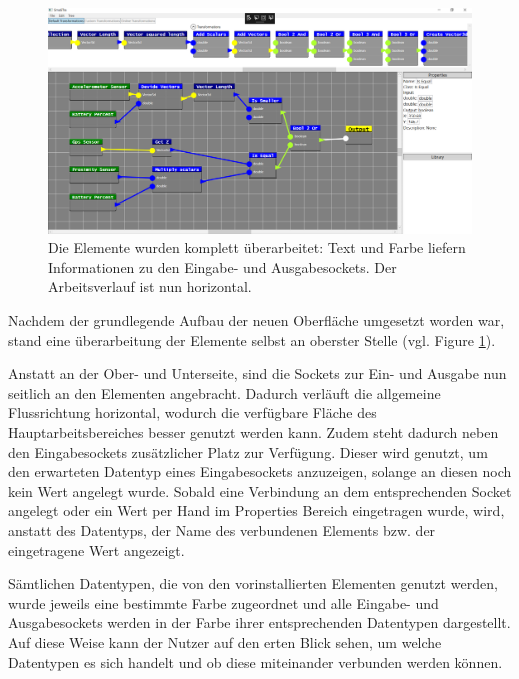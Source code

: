 \begin{figure} [h!]
	\centering
		\includegraphics[width = \textwidth]{Screenshots/Smastra_0_5_new_generic_elements}
	\caption{Die Elemente wurden komplett \"uberarbeitet: Text und Farbe liefern Informationen zu den Eingabe- und Ausgabesockets. Der Arbeitsverlauf ist nun horizontal.}
	\label{fig:screenshot_0_5_new_generic_elements}
\end{figure}

Nachdem der grundlegende Aufbau der neuen Oberfl\"ache umgesetzt worden war, stand eine \"uberarbeitung der Elemente selbst an oberster Stelle (vgl. Figure \ref{fig:screenshot_0_5_new_generic_elements}).

Anstatt an der Ober- und Unterseite, sind die Sockets zur Ein- und Ausgabe nun seitlich an den Elementen angebracht. Dadurch verl\"auft die allgemeine Flussrichtung horizontal, wodurch die verf\"ugbare Fl\"ache des Hauptarbeitsbereiches besser genutzt werden kann. 
Zudem steht dadurch neben den Eingabesockets zus\"atzlicher Platz zur Verf\"ugung. Dieser wird genutzt, um den erwarteten Datentyp eines Eingabesockets anzuzeigen, solange an diesen noch kein Wert angelegt wurde. Sobald eine Verbindung an dem entsprechenden Socket angelegt oder ein Wert per Hand im Properties Bereich eingetragen wurde, wird, anstatt des Datentyps, der Name des verbundenen Elements bzw. der eingetragene Wert angezeigt.

S\"amtlichen Datentypen, die von den vorinstallierten Elementen genutzt werden, wurde jeweils eine bestimmte Farbe zugeordnet und alle Eingabe- und Ausgabesockets werden in der Farbe ihrer entsprechenden Datentypen dargestellt.
Auf diese Weise kann der Nutzer auf den erten Blick sehen, um welche Datentypen es sich handelt und ob diese miteinander verbunden werden k\"onnen.
\\

